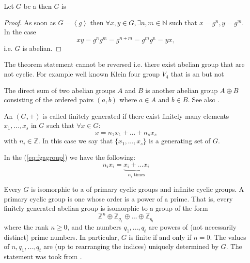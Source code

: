 \begin{appendices}
\begin{theorem}
  Let $G$ be a  then $G$ is
  \label{thm:cyclic_group_is_abelian}
  \begin{proof}
    As soon as $G = \left<g\right>$ then
    $\forall x,y \in G, \exists n,m \in \mathbb{N}$ such that
    $x = g^n, y = g^m$. In the case
    \[
    xy = g^n g^m = g^{n+m} = g^m g^n = yx,
    \]
    i.e. $G$ is abelian. 
  \end{proof}
\end{theorem}

\begin{remark}
  The theorem statement cannot be reversed i.e. there exist abelian
  group that are not cyclic. For example well known Klein four group
  $V_4$ \cite{wiki:klein4group} that is an
   but not   
\end{remark}

\begin{definition}
  The direct sum of two abelian groups $A$ and
  $B$ is another abelian group $A \oplus B$ consisting of the ordered
  pairs
  $\left(a, b\right)$ where $a \in A$ and $b \in B$.
  \cite{wiki:directsum}
  See also .
  
  \label{def:directsum}
\end{definition}

\begin{definition}
  An  $(G, +)$ is called finitely generated
  \cite{wiki:fgagroup} 
  if there exist finitely many elements $x_1, \dots, x_s$ in $G$ such that
  $\forall x \in G$:
  \begin{equation}
    x = n_1 x_1 + \dots + n_s x_s
    \label{eq:fgagroup}
  \end{equation}
  with $n_i \in \mathbb{Z}$. In this case we say that $\{x_1, \dots,
  x_s\}$ is a generating set of $G$.

  In the (\ref{eq:fgagroup}) we have the following:
  \[
  n_i x_i = \underbrace{x_i + \dots x_i}_{n_i \text{ times}}
  \]
  \label{def:fgagroup}
\end{definition}

\begin{theorem}
  Every  $G$ is isomorphic to a
   of primary cyclic groups and infinite cyclic
  groups. A primary cyclic group is one whose order is a power of a
  prime. That is, every finitely generated abelian group is isomorphic
  to a group of the form
  \[
  \mathbb{Z}^n \oplus \mathbb{Z}_{q_1} \oplus
  \dots \oplus \mathbb{Z}_{q_t}
  \]
  where the rank $n \ge 0$, and the numbers $q_1, \dots , q_t$ are
  powers of (not 
  necessarily distinct) prime numbers. In particular, $G$ is finite if
  and only if $n = 0$. The values of $n, q_1, \dots , q_t$ are (up to
  rearranging the indices) uniquely determined by $G$. 
  The statement was took from \cite{wiki:fgagroup}.
  \label{thm:fgagroup}
\end{theorem}


\end{appendices}
